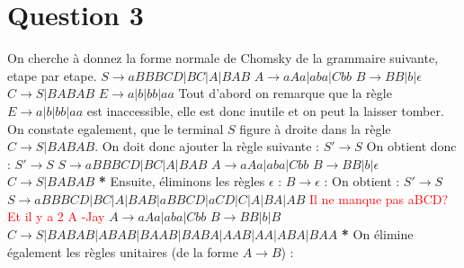 \documentclass{article}
\begin{document}
\newpage
\section*{Question 3}
\large On cherche à donnez la forme normale de Chomsky de la grammaire suivante, etape par etape.
\newline 
\newline $S \rightarrow aBBBCD|BC|A|BAB$
\newline $A \rightarrow aAa|aba|Cbb$
\newline $B \rightarrow BB|b|\epsilon$
\newline $C \rightarrow S|BABAB$
\newline $E \rightarrow a|b|bb|aa$
\newline 
\newline Tout d'abord on remarque que la règle $E \rightarrow a|b|bb|aa$ est inaccessible, elle est donc inutile et on peut la laisser tomber.
\newline On constate egalement, que le terminal $S$ figure à droite dans la règle \newline $C \rightarrow S|BABAB$. On doit donc ajouter la règle suivante : $S' \rightarrow S$
\newline 
\newline On obtient donc : 
\newline $S' \rightarrow S$
\newline $S \rightarrow aBBBCD|BC|A|BAB$
\newline $A \rightarrow aAa|aba|Cbb$
\newline $B \rightarrow BB|b|\epsilon$
\newline $C \rightarrow S|BABAB$
\newline
\newline \textbf{*} Ensuite, éliminons les règles $\epsilon$ : $B \rightarrow \epsilon$ :
\newline On obtient :
\newline $S' \rightarrow S$
\newline $S \rightarrow aBBBCD|BC|A|BAB|aBBCD|aCD|C|A|BA|AB$ \textcolor{red}{Il ne manque pas aBCD? Et il y a 2 A -Jay}
\newline $A \rightarrow aAa|aba|Cbb$
\newline $B \rightarrow BB|b|B$
\newline $C \rightarrow S|BABAB|ABAB|BAAB|BABA|AAB|AA|ABA|BAA$
\newline
\newline \textbf{*} On élimine également les règles unitaires (de la forme $A \rightarrow B$) :
\end{document}

